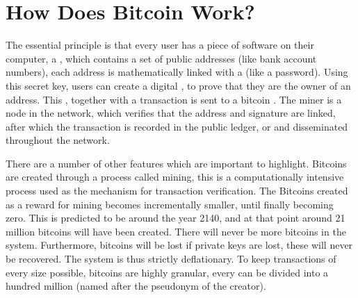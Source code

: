 
\chapter{How Does Bitcoin Work?}

The essential principle is that every user has a piece of software
on their computer, a\textbf{ }, which contains
a set of public addresses (like bank account numbers), each address
is mathematically linked with a \textbf{}
(like a password). Using this secret key, users can create a digital
, to prove that they are the owner of
an address. This , together with a transaction
is sent to a bitcoin \textbf{}. The miner
is a node in the network, which verifies that the address and signature
are linked, after which the transaction is recorded in the public
ledger, or \textbf{} and disseminated
throughout the network.

There are a number of other features which are important to highlight.
Bitcoins are created through a process called mining, this is a computationally
intensive process used as the mechanism for transaction verification.
The Bitcoins created as a reward for mining becomes incrementally
smaller, until finally becoming zero. This is predicted to be around
the year 2140, and at that point around 21 million bitcoins will have
been created. There will never be more bitcoins in the system. Furthermore,
bitcoins will be lost if private keys are lost, these will never be
recovered. The system is thus strictly deflationary. To keep transactions
of every size possible, bitcoins are highly granular, every 
can be divided into a hundred million \textbf{}
(named after the pseudonym of the creator).
